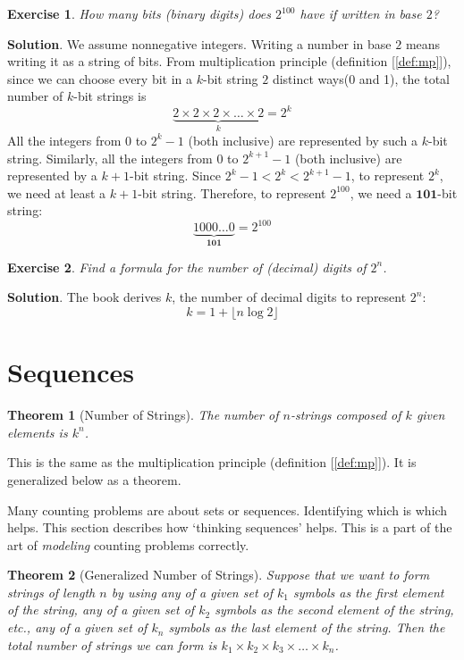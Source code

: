 \documentclass[11pt]{book}
\theoremstyle{definition}
\theoremstyle{plain}
\newtheorem{theorem}{Theorem}
\newtheorem{exercise}{Exercise}
\theoremstyle{definition}
\theoremstyle{problemstyle}
\theoremstyle{remark}
\theoremstyle{definition}
\begin{document}
\begin{exercise}
    How many bits (binary digits) does $2^{100}$ have if written in base $2$?
    
    \label{ex:1.4.1}
\end{exercise}
\textbf{Solution}. We assume nonnegative integers. Writing a number in base $2$ means writing it as a string of bits. From multiplication principle (definition [\ref{def:mp}]), since we can choose every bit in a $k$-bit string $2$ distinct ways(0 and 1), the total number of $k$-bit strings is 
\[
    \underbrace{2\times2\times2\times\dots\times2}_k=2^k
\]
All the integers from $0$ to $2^k-1$ (both inclusive) are represented by such a $k$-bit string. Similarly, all the integers from $0$ to $2^{k+1}-1$ (both inclusive) are represented by a $k+1$-bit string. Since $2^k-1<2^k<2^{k+1}-1$, to represent $2^k$, we need at least a $k+1$-bit string. Therefore, to represent $2^{100}$, we need a $\mathbf{101}$-bit string:
\[
    \underbrace{1000\dots0}_{\mathbf{101}}=2^{100}
\]
\begin{exercise}
    Find a formula for the number of (decimal) digits of $2^n$.
    \label{ex:1.4.2}
\end{exercise}
\textbf{Solution}. The book derives $k$, the number of decimal digits to represent $2^{n}$:
\[
    k=1+\lfloor n\log2\rfloor
\]

\section{Sequences}
\begin{theorem}[Number of Strings]
    The number of $n$-strings composed of $k$ given elements is $k^n$.
    \label{th:number-of-strings}
\end{theorem}

This is the same as the multiplication principle (definition [\ref{def:mp}]). It is generalized below as a theorem.

Many counting problems are about sets or sequences. Identifying which is which helps. This section describes how `thinking sequences' helps. This is a part of the art of \emph{modeling} counting problems correctly.

\begin{theorem}[Generalized Number of Strings]
    Suppose that we want to form strings of length $n$ by using any of a given set of $k_1$ symbols as the first element of the string, any of a given set of $k_2$ symbols as the second element of the string, etc., any of a given set of $k_n$ symbols as the last element of the string. Then the total number of strings we can form is $k_1\times k_2\times k_3\times\dots\times k_n$.
\end{theorem}
\end{document}

